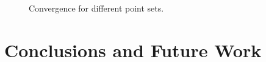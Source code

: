 \documentclass[12pt]{article}
\begin{document}
\begin{figure}[ht]
\begin{tabular}{cc}
		\end{tabular}
		\caption{Convergence for different point sets.}
		\label{convergence_points}
	\end{figure}

\section{Conclusions and Future Work}

 
\pagebreak
 
\printbibliography
\end{document}
